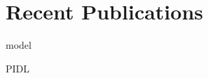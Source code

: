 \documentclass[12pt,letterpaper,english,bibliography=totocnumbered, abstract=on]{scrartcl}
\begin{document}
\section{Recent Publications}

model

PIDL

%
%
%


\newpage

\printbibliography
\end{document}
